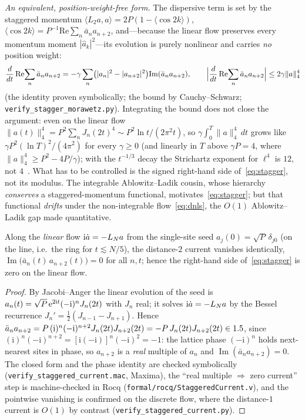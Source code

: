 \emph{An equivalent, position-weight-free form.} The dispersive term is set by the staggered momentum
$\langle L_2a,a\rangle=2P(1-\langle\cos2k\rangle)$, $\langle\cos2k\rangle=P^{-1}\mathrm{Re}\sum_n\bar a_na_{n+2}$,
and---because the linear flow preserves every momentum moment $|\hat a_k|^2$---its evolution is purely
nonlinear and carries \emph{no} position weight:
\begin{equation}\label{eq:stagger}
  \frac{d}{dt}\,\mathrm{Re}\!\sum_n\bar a_na_{n+2}
   =-\gamma\sum_n\bigl(|a_n|^2-|a_{n+2}|^2\bigr)\mathrm{Im}(\bar a_na_{n+2}),\qquad
  \Bigl|\frac{d}{dt}\,\mathrm{Re}\!\sum_n\bar a_na_{n+2}\Bigr|\le2\gamma\|a\|_4^4
\end{equation}
(the identity proven symbolically; the bound by Cauchy--Schwarz; \texttt{verify\_stagger\_morawetz.py}).
Integrating the bound does not close the argument: even on the linear flow
$\|a(t)\|_4^4=P^2\sum_nJ_n(2t)^4\sim P^2\ln t/(2\pi^2t)$, so $\gamma\int_0^T\|a\|_4^4\,dt$ grows like
$\gamma P^2(\ln T)^2/(4\pi^2)$ for every $\gamma\ge0$ (and linearly in $T$ above $\gamma P=4$, where
$\|a\|_4^4\ge P^2-4P/\gamma$); with the $t^{-1/3}$ decay the Strichartz exponent for $\ell^4$ is $12$, not
$4$~\cite{StefanovKevrekidis05}. What has to be controlled is the signed right-hand side
of~\eqref{eq:stagger}, not its modulus. The integrable Ablowitz--Ladik
cousin, whose hierarchy \emph{conserves} a staggered-momentum functional, motivates~\eqref{eq:stagger}; but
that functional \emph{drifts} under the non-integrable flow~\eqref{eq:dnls}, the $O(1)$ Ablowitz--Ladik gap
made quantitative.

\begin{lemma}\label{lem:stagger-leading}
Along the \emph{linear} flow $\mathrm i\dot a=-L_N a$ from the single-site seed $a_j(0)=\sqrt P\,\delta_{j0}$
(on the line, i.e.\ the ring for $t\lesssim N/5$), the distance-$2$ current vanishes identically,
$\operatorname{Im}\bigl(\bar a_n(t)\,a_{n+2}(t)\bigr)=0$ for all $n,t$; hence the right-hand side
of~\eqref{eq:stagger} is zero on the linear flow.
\end{lemma}
\begin{proof}
By Jacobi--Anger the linear evolution of the seed is $a_n(t)=\sqrt P\,\mathrm{e}^{2\mathrm i t}(-\mathrm i)^n J_n(2t)$
with $J_n$ real; it solves $\mathrm i\dot a=-L_N a$ by the Bessel recurrence $J_n'=\tfrac12(J_{n-1}-J_{n+1})$.
Hence $\bar a_na_{n+2}=P\,(\mathrm i)^n(-\mathrm i)^{n+2}J_n(2t)J_{n+2}(2t)=-P\,J_n(2t)J_{n+2}(2t)\in1.5$, since
$(\mathrm i)^n(-\mathrm i)^{n+2}=[\mathrm i(-\mathrm i)]^n(-\mathrm i)^2=-1$: the lattice phase $(-\mathrm i)^n$
holds next-nearest sites in phase, so $a_{n+2}$ is a \emph{real} multiple of $a_n$ and
$\operatorname{Im}(\bar a_na_{n+2})=0$. The closed form and the phase identity are checked symbolically
(\texttt{verify\_staggered\_current.mac}, Maxima), the ``real multiple $\Rightarrow$ zero current'' step is
machine-checked in Rocq (\texttt{formal/rocq/StaggeredCurrent.v}), and the pointwise vanishing is confirmed
on the discrete flow, where the distance-$1$ current is $O(1)$ by contrast
(\texttt{verify\_staggered\_current.py}). \end{proof}

